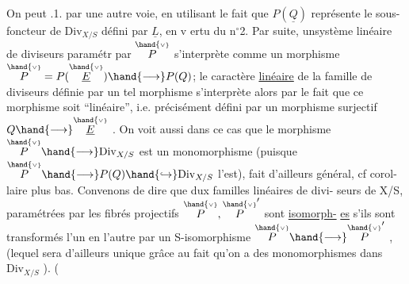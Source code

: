 On peut  .1. par une autre voie, en utilisant le fait
que $P(\underline{Q})$ représente le  sous-foncteur de $\mathrm{Div}_{X/S}$ défini par
$\underline{L}$, en v ertu du n$^{\circ}$2. Par suite, unsystème linéaire de diviseurs paramétr
par $\overset{\hand{\scriptscriptstyle\vee}}{P}$  s'interprète comme un morphisme $\overset{\hand{\scriptscriptstyle\vee}}{P} = P(\overset{\hand{\scriptscriptstyle\vee}}{\underline{E}})\hand{\longrightarrow} P(Q)$; le caractère
\uline{linéaire} de la famille de diviseurs définie par un tel morphisme
s'interprète alors par le fait que ce morphisme soit ``linéaire'', i.e.
précisément défini par un morphisme surjectif $Q\hand{\longrightarrow}\overset{\hand{\scriptscriptstyle\vee}}{\underline{E}}$ .  On voit aussi
dans ce cas que le morphisme $\overset{\hand{\scriptscriptstyle\vee}}{P}\hand{\longrightarrow}\mathrm{Div}_{X/S}$ est un monomorphisme 
(puisque $\overset{\hand{\scriptscriptstyle\vee}}{P}\hand{\longrightarrow} P(Q)\hand{\hookrightarrow}\mathrm{Div}_{X/S}$ l'est), fait d'ailleurs  général, cf corol-%
laire plus bas. Convenons  de dire que dux familles linéaires de divi-%
seurs de X/S, paramétrées par les fibrés projectifs $\overset{\hand{\scriptscriptstyle\vee}}{P},\overset{\hand{\scriptscriptstyle\vee}}{P}'$ sont \uline{isomorph-}%
\uline{es} s'ils sont transformés l'un en l'autre par un S-isomorphisme $\overset{\hand{\scriptscriptstyle\vee}}{P}\hand{\longrightarrow}\overset{\hand{\scriptscriptstyle\vee}}{P}'$ ,
(lequel sera d'ailleurs unique grâce au fait qu'on a des monomorphismes
dans $\mathrm{Div}_{X/S}$ ). 
(

